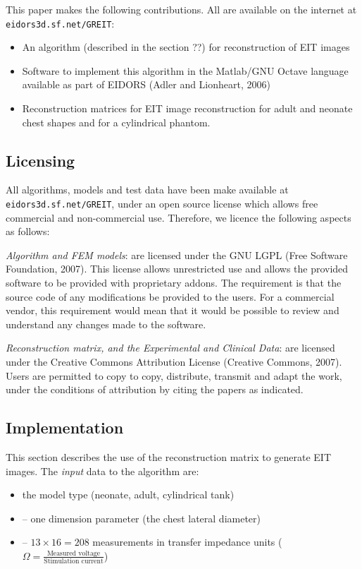 \documentclass[letterpaper,twocolumn,11pt]{article}
\begin{document}
This paper makes the following contributions. All are
available on the internet at \verb+eidors3d.sf.net/GREIT+:
\begin{itemize}
\item An algorithm (described in the section ??) for reconstruction
         of EIT images
\item Software to implement this algorithm in the Matlab/GNU Octave
         language available as part of EIDORS (Adler and Lionheart, 2006)
\item Reconstruction matrices for EIT image reconstruction for
      adult and neonate chest shapes and for a cylindrical phantom.
\end{itemize}


\subsection{Licensing}
All algorithms, models and test data have been make
available at \verb+eidors3d.sf.net/GREIT+,
under an open source license which allows
free commercial and non-commercial use. Therefore,
we licence the following aspects as follows:

{\em Algorithm and FEM models}:
   are licensed under the GNU LGPL (Free Software Foundation, 2007).
   This license allows
   unrestricted use and allows the provided software to
   be provided with proprietary addons. The requirement is
   that the source code of any modifications be provided to
   the users. For a commercial vendor, this requirement would
   mean that it would be possible to review and understand any
   changes made to the software.

{\em Reconstruction matrix, and the Experimental and Clinical Data}:
   are licensed under the Creative Commons Attribution
   License (Creative Commons, 2007). Users are permitted
   to copy to copy, distribute, transmit and adapt the work,
   under the conditions of attribution by citing the
   papers as indicated.

\subsection{Implementation }
This section describes the use of the reconstruction
matrix to generate EIT images.
The {\em input} data to the algorithm are:
\begin{itemize}
\item[]
the model type (neonate, adult, cylindrical tank) 
\item[]
   -- one dimension parameter (the chest lateral diameter) 
\item[]
   -- $13\times 16=208$ measurements in transfer impedance units
      ($\Omega = \frac{\mbox{Measured voltage}}
                      {\mbox{Stimulation current}}$)
\end{itemize}
\end{document}
